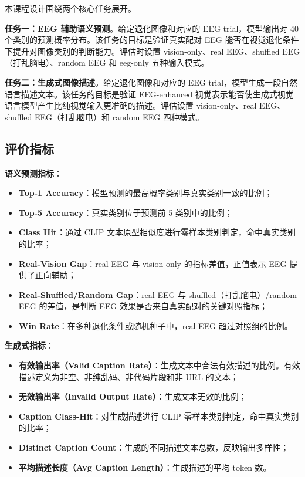 本课程设计围绕两个核心任务展开。

\textbf{任务一：EEG 辅助语义预测}。给定退化图像和对应的 EEG trial，模型输出对 40 个类别的预测概率分布。该任务的目标是验证真实配对 EEG 能否在视觉退化条件下提升对图像类别的判断能力。评估时设置 vision-only、real EEG、shuffled EEG（打乱脑电）、random EEG 和 eeg-only 五种输入模式。

\textbf{任务二：生成式图像描述}。给定退化图像和对应的 EEG trial，模型生成一段自然语言描述文本。该任务的目标是验证 EEG-enhanced 视觉表示能否使生成式视觉语言模型产生比纯视觉输入更准确的描述。评估设置 vision-only、real EEG、shuffled EEG（打乱脑电）和 random EEG 四种模式。

\subsection{评价指标}

\textbf{语义预测指标}：

\begin{itemize}
  \item \textbf{Top-1 Accuracy}：模型预测的最高概率类别与真实类别一致的比例；
  \item \textbf{Top-5 Accuracy}：真实类别位于预测前 5 类别中的比例；
  \item \textbf{Class Hit}：通过 CLIP 文本原型相似度进行零样本类别判定，命中真实类别的比率；
  \item \textbf{Real-Vision Gap}：real EEG 与 vision-only 的指标差值，正值表示 EEG 提供了正向辅助；
  \item \textbf{Real-Shuffled/Random Gap}：real EEG 与 shuffled（打乱脑电）/random EEG 的差值，是判断 EEG 效果是否来自真实配对的关键对照指标；
  \item \textbf{Win Rate}：在多种退化条件或随机种子中，real EEG 超过对照组的比例。
\end{itemize}

\textbf{生成式指标}：

\begin{itemize}
  \item \textbf{有效输出率（Valid Caption Rate）}：生成文本中合法有效描述的比例。有效描述定义为非空、非纯乱码、非代码片段和非 URL 的文本；
  \item \textbf{无效输出率（Invalid Output Rate）}：生成文本无效的比例；
  \item \textbf{Caption Class-Hit}：对生成描述进行 CLIP 零样本类别判定，命中真实类别的比率；
  \item \textbf{Distinct Caption Count}：生成的不同描述文本总数，反映输出多样性；
  \item \textbf{平均描述长度（Avg Caption Length）}：生成描述的平均 token 数。
\end{itemize}
